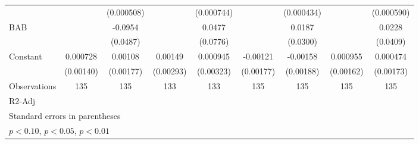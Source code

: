 \begin{table}[htbp]
\begin{tabular}{l*{8}{c}}
                    &                     &  (0.000508)         &                     &  (0.000744)         &                     &  (0.000434)         &                     &  (0.000590)         \\
[1em]
BAB                 &                     &     -0.0954\sym{*}  &                     &      0.0477         &                     &      0.0187         &                     &      0.0228         \\
                    &                     &    (0.0487)         &                     &    (0.0776)         &                     &    (0.0300)         &                     &    (0.0409)         \\
[1em]
Constant            &    0.000728         &     0.00108         &     0.00149         &    0.000945         &    -0.00121         &    -0.00158         &    0.000955         &    0.000474         \\
                    &   (0.00140)         &   (0.00177)         &   (0.00293)         &   (0.00323)         &   (0.00177)         &   (0.00188)         &   (0.00162)         &   (0.00173)         \\
\hline
Observations        &         135         &         135         &         133         &         133         &         135         &         135         &         135         &         135         \\
R2-Adj              &                     &                     &                     &                     &                     &                     &                     &                     \\
\hline\hline
\multicolumn{9}{l}{\footnotesize Standard errors in parentheses}\\
\multicolumn{9}{l}{\footnotesize \sym{*} \(p<0.10\), \sym{**} \(p<0.05\), \sym{***} \(p<0.01\)}\\
\end{tabular}
\end{table}
